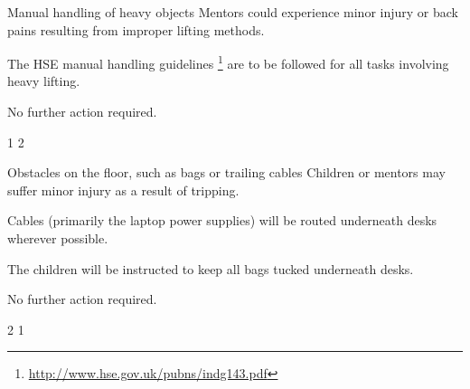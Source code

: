 {    \risk
        {Manual handling of heavy objects}
        {Mentors could experience minor injury or back pains resulting from
        improper lifting methods.}
        {\item The HSE manual handling guidelines%
         \footnote{\url{http://www.hse.gov.uk/pubns/indg143.pdf}}
         are to be followed for all tasks involving heavy lifting.}
        {\item No further action required.}
        {1} %
        {2} %
    
    \risk
        {Obstacles on the floor, such as bags or trailing cables}
        {Children or mentors may suffer minor injury as a result of tripping.}
        {\item Cables (primarily the laptop power supplies) will be routed
         underneath desks wherever possible.
         \item The children will be instructed to keep all bags tucked underneath
         desks.}
        {\item No further action required.}
        {2} %
        {1} %
}



